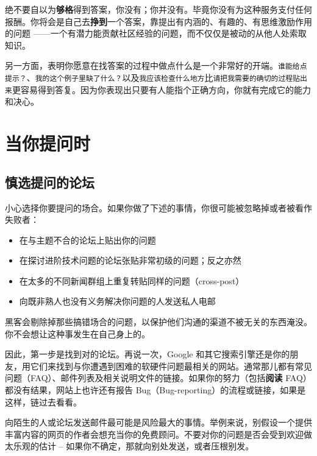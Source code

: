 \documentclass[titlepage]{article}
\begin{document}
绝不要自以为\textbf{够格}得到答案，你没有；你并没有。毕竟你没有为这种服务支付任何报酬。你将会是自己去\textbf{挣到}一个答案，靠提出有内涵的、有趣的、有思维激励作用的问题
——一个有潜力能贡献社区经验的问题，而不仅仅是被动的从他人处索取知识。

另一方面，表明你愿意在找答案的过程中做点什么是一个非常好的开端。\texttt{谁能给点提示？}、\texttt{我的这个例子里缺了什么？}以及\texttt{我应该检查什么地方}比\texttt{请把我需要的确切的过程贴出来}更容易得到答复。因为你表现出只要有人能指个正确方向，你就有完成它的能力和决心。

\hypertarget{ux5f53ux4f60ux63d0ux95eeux65f6}{\section{当你提问时}\label{ux5f53ux4f60ux63d0ux95eeux65f6}}

\hypertarget{ux614eux9009ux63d0ux95eeux7684ux8bbaux575b}{\subsection{慎选提问的论坛}\label{ux614eux9009ux63d0ux95eeux7684ux8bbaux575b}}

小心选择你要提问的场合。如果你做了下述的事情，你很可能被忽略掉或者被看作失败者：

\begin{itemize}

\item
  在与主题不合的论坛上贴出你的问题
\item
  在探讨进阶技术问题的论坛张贴非常初级的问题；反之亦然
\item
  在太多的不同新闻群组上重复转贴同样的问题（cross-post）
\item
  向既非熟人也没有义务解决你问题的人发送私人电邮
\end{itemize}

黑客会剔除掉那些搞错场合的问题，以保护他们沟通的渠道不被无关的东西淹没。你不会想让这种事发生在自己身上的。

因此，第一步是找到对的论坛。再说一次，Google
和其它搜索引擎还是你的朋友，用它们来找到与你遭遇到困难的软硬件问题最相关的网站。通常那儿都有常见问题（FAQ）、邮件列表及相关说明文件的链接。如果你的努力（包括\textbf{阅读}
FAQ）都没有结果，网站上也许还有报告
Bug（Bug-reporting）的流程或链接，如果是这样，链过去看看。

向陌生的人或论坛发送邮件最可能是风险最大的事情。举例来说，别假设一个提供丰富内容的网页的作者会想充当你的免费顾问。不要对你的问题是否会受到欢迎做太乐观的估计
-- 如果你不确定，那就向别处发送，或者压根别发。
\end{document}
